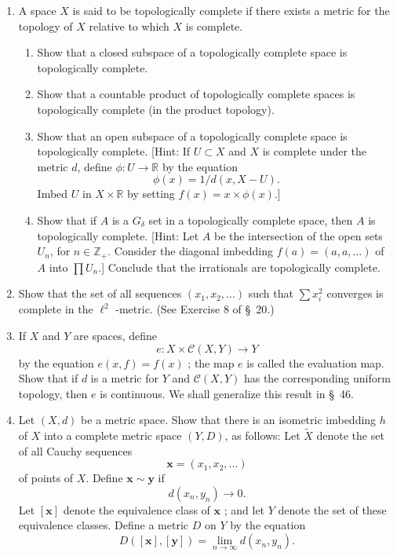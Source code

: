 \begin{enumerate}[itemsep=0.4em, parsep=0pt, topsep=0pt, partopsep=0pt, leftmargin=*, label=\arabic*., ref=\arabic*]
\item A space \(X\) is said to be topologically complete if there exists a metric for the topology of \(X\) relative to which \(X\) is complete.
 \begin{enumerate}[itemsep=0.2em, parsep=0pt, topsep=0pt, partopsep=0pt, leftmargin=*, label=(\alph*), align=left]
 \item Show that a closed subspace of a topologically complete space is topologically complete.
 \item Show that a countable product of topologically complete spaces is topologically complete (in the product topology).
 \item Show that an open subspace of a topologically complete space is topologically complete. [Hint: If \(U \subset X\) and \(X\) is complete under the metric \(d\), define \(\phi : U \rightarrow \mathbb{R}\) by the equation \[ \phi (x) = 1/d({x,X - U}). \] Imbed \(U\) in \(X \times \mathbb{R}\) by setting \(f(x) = x \times \phi (x)\).]
 \item Show that if \(A\) is a \(G_{\delta }\) set in a topologically complete space, then \(A\) is topologically complete. [Hint: Let \(A\) be the intersection of the open sets \(U_{n}\), for \(n \in {\mathbb{Z}}_{ + }\). Consider the diagonal imbedding \(f( a) = ({a,a,\ldots })\) of \(A\) into \(\prod {U}_{n}\).] Conclude that the irrationals are topologically complete.
 \end{enumerate}
\item Show that the set of all sequences \(({x_{1},x_{2},\ldots })\) such that \(\sum {x}_i^{2}\) converges is complete in the \({\ell }^{2}\) -metric. (See Exercise 8 of \S\ 20.)
\item If \(X\) and \(Y\) are spaces, define \[ e : X \times \mathcal{C}({X,Y}) \rightarrow Y \] by the equation \(e({x,f}) = f(x)\) ; the map \(e\) is called the evaluation map. Show that if \(d\) is a metric for \(Y\) and \(\mathcal{C}({X,Y})\) has the corresponding uniform topology, then \(e\) is continuous. We shall generalize this result in \S\ 46.
\item Let \((X, d)\) be a metric space. Show that there is an isometric imbedding \(h\) of \(X\) into a complete metric space \((Y, D)\), as follows: Let \(\widetilde{X}\) denote the set of all Cauchy sequences \[ \mathbf{x} = ({x_{1},x_{2},\ldots }) \] of points of \(X\). Define \(\mathbf{x} \sim \mathbf{y}\) if \[ d({x_{n},y_{n}}) \rightarrow 0. \] Let \([ \mathbf{x}]\) denote the equivalence class of \(\mathbf{x}\) ; and let \(Y\) denote the set of these equivalence classes. Define a metric \(D\) on \(Y\) by the equation \[ D({[ \mathbf{x}] ,[ \mathbf{y}] }) = \mathop{\lim }\limits_{{n \rightarrow \infty }}d({x_{n},y_{n}}). \]

\end{enumerate}
